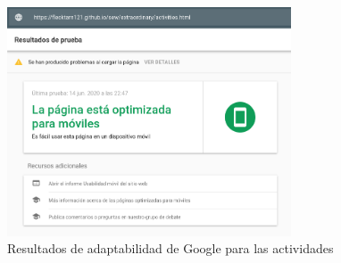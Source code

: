 \documentclass[11pt]{article}
\begin{document}
\begin{figure}[h]
    \centering
    \includegraphics[width=0.75\textwidth]{google4.png}
    \caption{Resultados de adaptabilidad de Google para las actividades}
\end{figure}

        
\end{document}
